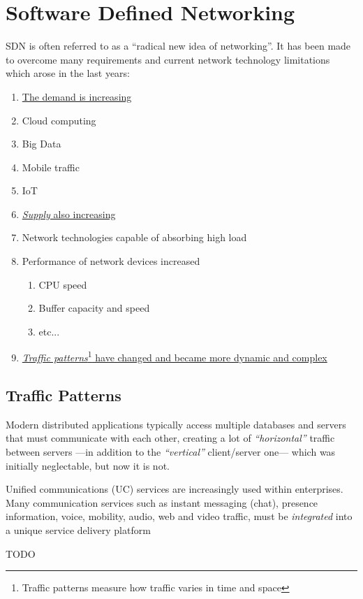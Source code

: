 \chapter{Software Defined Networking}

SDN is often referred to as a ``radical new idea of networking''. It has been made to overcome many requirements and current network technology limitations which arose in the last years:
\begin{enumerate}
   \item[] \ul{The demand is increasing}
   \item Cloud computing
   \item Big Data
   \item Mobile traffic
   \item IoT
   \item[] \ul{\textit{Supply} also increasing}
   \item Network technologies capable of absorbing high load
   \item Performance of network devices increased
   \begin{enumerate}
      \item CPU speed
      \item Buffer capacity and speed
      \item etc...
   \end{enumerate}
   \item[] \ul{\textit{Traffic patterns}\footnote{Traffic patterns measure how traffic varies in time and space} have changed and became more dynamic and complex} 
\end{enumerate}

\section{Traffic Patterns}
Modern distributed applications typically access multiple databases and servers that
must communicate with each other, creating a lot of
\textit{``horizontal''} traffic between servers ---in addition to the \textit{``vertical''} client/server one--- which was initially neglectable, but now it is not.

Unified communications (UC) services are increasingly used within enterprises. Many communication services such as instant messaging (chat), presence
information, voice, mobility, audio, web and video traffic, must be \textit{integrated} into a unique service
delivery platform

TODO

